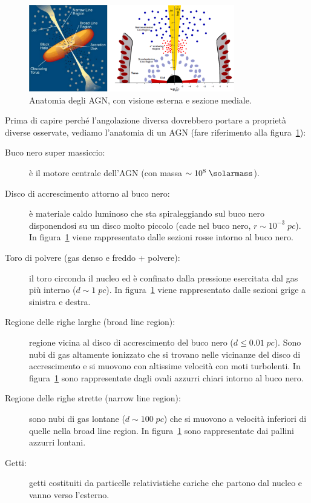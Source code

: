 \begin{figure}
    \centering
    \includegraphics[width = 0.8\textwidth]{immagini/sezione-e-anatomia-agn.png}
    \caption{Anatomia degli AGN, con visione esterna e sezione mediale.}
    \label{fig:sezione-e-anatomia-agn}
\end{figure}

Prima di capire perché l’angolazione diversa dovrebbero portare a proprietà diverse osservate, vediamo l’anatomia di un AGN (fare riferimento alla figura~\ref{fig:sezione-e-anatomia-agn}):
\begin{description}
    \item[Buco nero super massiccio:] è il motore centrale dell'AGN (con massa $\sim 10^8 \;\si{\solarmass}$).
    \item[Disco di accrescimento attorno al buco nero:] è materiale caldo luminoso che sta spiraleggiando sul buco nero disponendosi su un disco molto piccolo (cade nel buco nero, $r \sim 10^{-3} \;\si{pc}$). In figura~\ref{fig:sezione-e-anatomia-agn} viene rappresentato dalle sezioni rosse intorno al buco nero. 
    \item[Toro di polvere (gas denso e freddo + polvere):] il toro circonda il nucleo ed è confinato dalla pressione esercitata dal gas più interno ($d \sim 1 \;\si{pc}$). In figura~\ref{fig:sezione-e-anatomia-agn} viene rappresentato dalle sezioni grige a sinistra e destra.
    \item[Regione delle righe larghe (broad line region):] regione vicina al disco di accrescimento del buco nero ($d \leq 0.01 \;\si{pc}$). Sono nubi di gas altamente ionizzato che si trovano nelle vicinanze del disco di accrescimento e si muovono con altissime velocità con moti turbolenti. In figura~\ref{fig:sezione-e-anatomia-agn} sono rappresentate dagli ovali azzurri chiari intorno al buco nero. 
    \item[Regione delle righe strette (narrow line region):] sono nubi di gas lontane ($d \sim 100 \;\si{pc}$) che si muovono a velocità inferiori di quelle nella broad line region. In figura~\ref{fig:sezione-e-anatomia-agn} sono rappresentate dai pallini azzurri lontani. 
    \item[Getti:] getti costituiti da particelle relativistiche cariche che partono dal nucleo e vanno verso l’esterno.
\end{description}

